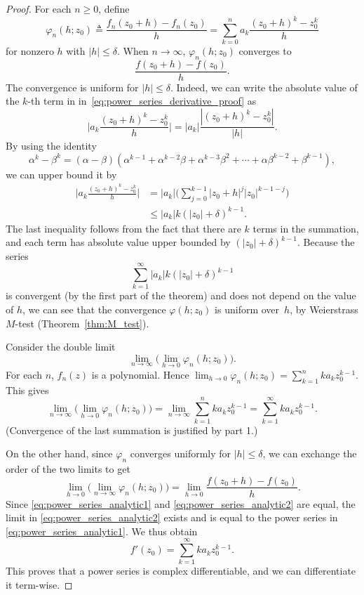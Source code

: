 \begin{proof}
	For each $n\geq 0$, define
	\begin{equation}
		\varphi_n(h;z_0) \triangleq \frac{f_n(z_0+h)-f_n(z_0)}{h} = \sum_{k=0}^n a_k \frac{(z_0+h)^k - z_0^k}{h}
		\label{eq:power_series_derivative_proof}
	\end{equation}
	for nonzero $h$ with $|h|\leq \delta$. When $n\rightarrow\infty$, $\varphi_n(h;z_0)$ converges to
	$$
	\frac{f(z_0+h)-f(z_0)}{h}.
	$$
	The convergence is uniform for $|h|\leq \delta $. Indeed, we can write the absolute value of the $k$-th term in in~\eqref{eq:power_series_derivative_proof} as
	$$
	\Big|a_k \frac{(z_0+h)^k - z_0^k}{h} \Big|  = 
	|a_k|  \frac{|(z_0+h)^k - z_0^k|}{|h|}.
	$$	
	By using the identity
	$$
	\alpha^k-\beta^k = (\alpha-\beta)(\alpha^{k-1}+\alpha^{k-2}\beta + \alpha^{k-3}\beta^2+ \cdots + \alpha \beta^{k-2} + \beta^{k-1}),
	$$
	we can upper bound it by
	\begin{align*}
		\Big|a_k \frac{(z_0+h)^k - z_0^k}{h} \Big| 
		& =  |a_k| \Big( \sum_{j=0}^{k-1} |z_0+h|^j |z_0|^{k-1-j} \Big)\\
		& \leq  |a_k|k (|z_0|+\delta)^{k-1}.
	\end{align*}
	The last inequality follows from the fact that there are $k$ terms in the summation, and each term has absolute value upper bounded by $(|z_0|+\delta)^{k-1}$.
	Because the series 
	$$\sum_{k=1}^\infty |a_k| k (|z_0|+\delta)^{k-1}$$
	is convergent (by the first part of the theorem) and does not depend on the value of $h$, we can see that the convergence $\varphi(h;z_0)$ is uniform over~$h$, by Weierstrass $M$-test (Theorem~\ref{thm:M_test}).
	
	Consider the double limit
	$$
	\lim_{n\rightarrow \infty} \Big( \lim_{h\rightarrow 0} \varphi_n(h;z_0) \Big).
	$$
	For each $n$, $f_n(z)$ is a polynomial. Hence $\lim_{h\rightarrow 0} \varphi_n(h;z_0) = \sum_{k=1}^n k a_k z_0^{k-1}$. This gives
	\begin{equation}
		\lim_{n\rightarrow \infty} \Big( \lim_{h\rightarrow 0} \varphi_n(h;z_0) \Big) =
		\lim_{n\rightarrow \infty} \sum_{k=1}^n k a_k z_0^{k-1} =
		\sum_{k=1}^\infty k a_k z_0^{k-1} .
		\label{eq:power_series_analytic1}
	\end{equation}
	(Convergence of the last summation is justified by part 1.)
	
	On the other hand, since $\varphi_n$ converges uniformly for $|h|\leq \delta$, we can exchange the order of the two limits to get 
	\begin{equation}
		\lim_{h\rightarrow 0}  \Big( \lim_{n\rightarrow \infty} \varphi_n(h;z_0) \Big)
		=
		\lim_{h\rightarrow 0} \frac{f(z_0+h) - f(z_0)}{h}.
		\label{eq:power_series_analytic2}
	\end{equation}
	Since \eqref{eq:power_series_analytic1} and \eqref{eq:power_series_analytic2} are equal, the limit in \eqref{eq:power_series_analytic2} exists and is equal to the power series in \eqref{eq:power_series_analytic1}. We thus obtain
	$$
	f'(z_0) = \sum_{k=1}^\infty k a_k z_0^{k-1}.
	$$
	This proves that a power series is complex differentiable, and we can differentiate it term-wise.
\end{proof}






